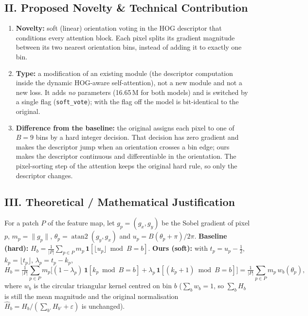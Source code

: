 \documentclass[8pt,a4paper]{article}
\begin{document}
\subsection*{II. Proposed Novelty \& Technical Contribution}
\begin{enumerate}
    \item \textbf{Novelty:} soft (linear) orientation voting in the HOG descriptor that conditions every attention block. Each pixel splits its gradient magnitude between its two nearest orientation bins, instead of adding it to exactly one bin.
    \item \textbf{Type:} a modification of an existing module (the descriptor computation inside the dynamic HOG-aware self-attention), not a new module and not a new loss. It adds \emph{no} parameters (16.65\,M for both models) and is switched by a single flag (\texttt{soft\_vote}); with the flag off the model is bit-identical to the original.
    \item \textbf{Difference from the baseline:} the original assigns each pixel to one of $B{=}9$ bins by a hard integer decision. That decision has zero gradient and makes the descriptor jump when an orientation crosses a bin edge; ours makes the descriptor continuous and differentiable in the orientation. The pixel-sorting step of the attention keeps the original hard rule, so only the descriptor changes.
\end{enumerate}

\subsection*{III. Theoretical / Mathematical Justification}
For a patch $P$ of the feature map, let $g_p{=}(g_x,g_y)$ be the Sobel gradient of pixel $p$, $m_p{=}\lVert g_p\rVert$, $\theta_p{=}\operatorname{atan2}(g_y,g_x)$ and $u_p{=}B(\theta_p{+}\pi)/2\pi$. \textbf{Baseline (hard):} $H_b=\tfrac1{|P|}\sum_{p\in P} m_p\,\mathbf 1[\lfloor u_p\rfloor \bmod B=b]$. \textbf{Ours (soft):} with $t_p{=}u_p{-}\tfrac12$, $k_p{=}\lfloor t_p\rfloor$, $\lambda_p{=}t_p{-}k_p$,
\begin{equation*}
H_b=\tfrac1{|P|}\sum_{p\in P} m_p\Big[(1{-}\lambda_p)\,\mathbf 1[k_p \bmod B=b]+\lambda_p\,\mathbf 1[(k_p{+}1)\bmod B=b]\Big]=\tfrac1{|P|}\sum_{p\in P} m_p\,w_b(\theta_p),
\end{equation*}
where $w_b$ is the circular triangular kernel centred on bin $b$ ($\sum_b w_b{=}1$, so $\sum_b H_b$ is still the mean magnitude and the original normalisation $\hat H_b{=}H_b/(\sum_{b'} H_{b'}{+}\varepsilon)$ is unchanged).
\end{document}
